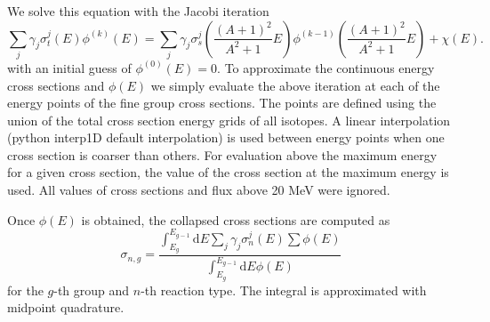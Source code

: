 \documentclass[12pt]{article}
\renewcommand{\d}{\mathrm{d}}
\newenvironment{solnum}[2][Solution]{\begin{trivlist}
\item[\hskip \labelsep {\bfseries #1}\hskip \labelsep {\bfseries #2:}]\hspace{0.3in}\newline\newline}{\end{trivlist}}
\begin{document}
\begin{solnum}{1}
\begin{equation}
\end{equation}
We solve this equation with the Jacobi iteration
\begin{equation}
    \sum_{j} \gamma_j \sigma_t^j(E) \phi^{(k)}(E) = \sum_{j} \gamma_j \sigma_s^j
    \left(\frac{(A+1)^2}{A^2+1}E\right) \phi^{(k-1)}\left(\frac{(A+1)^2}{A^2+1}E\right) 
   + {\chi(E)} .
\end{equation}
with an initial guess of $\phi^{(0)}(E)=0$.
To approximate the continuous energy cross sections and $\phi(E)$ we simply evaluate the
above iteration at each of the energy points of the fine group cross sections. The
points are defined using the union of the total cross section energy grids of all
isotopes.  A linear interpolation (python interp1D default interpolation) is used between energy points when one
cross section is coarser than others. For evaluation above the maximum energy for a
given cross section, the value of the cross section at the maximum energy is used.
All values of cross sections and flux above 20 MeV were ignored.  

Once $\phi(E)$ is obtained, the collapsed cross sections are computed as
\begin{equation}
    \sigma_{n,g} = \frac{\int_{E_g}^{E_{g-1}} \d E  \sum_{j} \gamma_j \sigma_n^j(E)
\sum\phi(E)}{\int_{E_g}^{E_{g-1}} \d E \phi(E)}
\end{equation}
for the $g$-th group and $n$-th reaction type. The integral is approximated with
midpoint quadrature.



\end{solnum}
\end{document}
